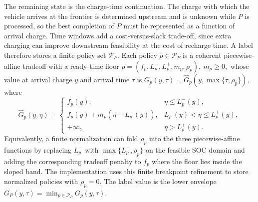\documentclass[review,3p,authoryear]{elsarticle}
\theoremstyle{plain}
\theoremstyle{definition}
\theoremstyle{remark}
\begin{document}
The remaining state is the charge-time continuation. The charge with which the
vehicle arrives at the frontier is determined upstream and is unknown while $P$ is
processed, so the best completion of $P$ must be represented as a function of
arrival charge. Time windows add a cost-versus-slack trade-off, since extra charging
can improve downstream feasibility at the cost of recharge time. A label therefore
stores a finite policy set $\mathcal P_P$. Each policy $p\in\mathcal P_P$ is a coherent piecewise-affine
tradeoff with a ready-time floor $p=(f_p,L_p^-,L_p^+,m_p,\rho_p),~m_p\ge0,$
whose value at arrival charge \(y\) and arrival time \(\tau\) is $ G_p(y,\tau)=\widehat G_p(y,\max\{\tau,\rho_p\}),$
where
\[
\widehat G_p(y,\eta)=
\begin{cases}
f_p(y), & \eta\le L_p^-(y),\\
f_p(y)+m_p(\eta-L_p^-(y)), & L_p^-(y)<\eta\le L_p^+(y),\\
+\infty, & \eta>L_p^+(y).
\end{cases}
\]
Equivalently, a finite normalization can fold $\rho_p$ into the three
piecewise-affine functions by replacing $L_p^-$ with
$\max\{L_p^-,\rho_p\}$ on the feasible SOC domain and adding the corresponding
tradeoff penalty to $f_p$ where the floor lies inside the sloped band. The
implementation uses this finite breakpoint refinement to store normalized policies
with $\rho_p=0$. The label value is the lower envelope $G_P(y,\tau)=\min_{p\in\mathcal P_P}G_p(y,\tau). $
\end{document}
